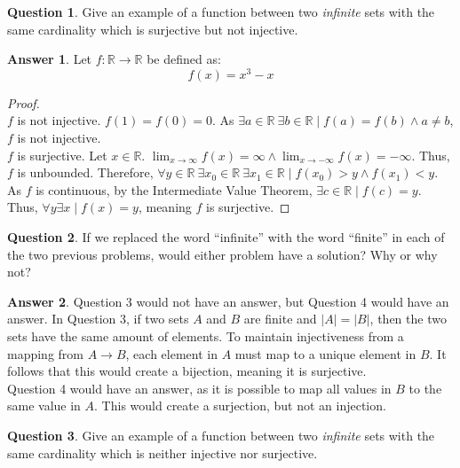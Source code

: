 \documentclass[article, 12pt]{article}
\theoremstyle{definition}
\newtheorem{question}{Question}
\newtheorem{answer}{Answer}
\newcommand{\reals}{\mathbb{R}} %
\begin{document}
    \begin{question}
        Give an example of a function between two \textit{infinite} sets with the same cardinality which is surjective but not injective.
    \end{question}

    \begin{answer}
        Let $f: \reals \to \reals$ be defined as:
        \[ f(x) = x^3 - x \]
        \begin{proof} \ \\
            $f$ is not injective. $f(1) = f(0) = 0$. As $\exists a \in \reals \ \exists b \in \reals \mid f(a) = f(b) \land a \neq b$, $f$ is not injective.
            \\[12pt]
            $f$ is surjective. Let $x \in \reals$. $\displaystyle\lim_{x \to \infty} f(x) = \infty \land \lim_{x \to -\infty} f(x) = -\infty$. Thus, $f$ is unbounded. Therefore, $\forall y \in \reals \ \exists x_0 \in \reals \ \exists x_1 \in \reals \mid f(x_0) > y \land f(x_1) < y$. As $f$ is continuous, by the Intermediate Value Theorem, $\exists c \in \reals \mid f(c) = y$. Thus, $\forall y \exists x \mid f(x) = y$, meaning $f$ is surjective.
        \end{proof}
    \end{answer}
    \begin{question}
        If we replaced the word “infinite” with the word “finite” in each of the two previous problems, would either problem have a solution? Why or why not?    
    \end{question}

    \begin{answer}
        Question 3 would not have an answer, but Question 4 would have an answer. In Question 3, if two sets $A$ and $B$ are finite and $|A| = |B|$, then the two sets have the same amount of elements. To maintain injectiveness from a mapping from $A \to B$, each element in $A$ must map to a unique element in $B$. It follows that this would create a bijection, meaning it is surjective.
        \\[12pt]
        Question 4 would have an answer, as it is possible to map all values in $B$ to the same value in $A$. This would create a surjection, but not an injection.
    \end{answer}

    \begin{question}
        Give an example of a function between two \textit{infinite} sets with the same cardinality which is neither injective nor surjective.    
    \end{question}
\end{document}
